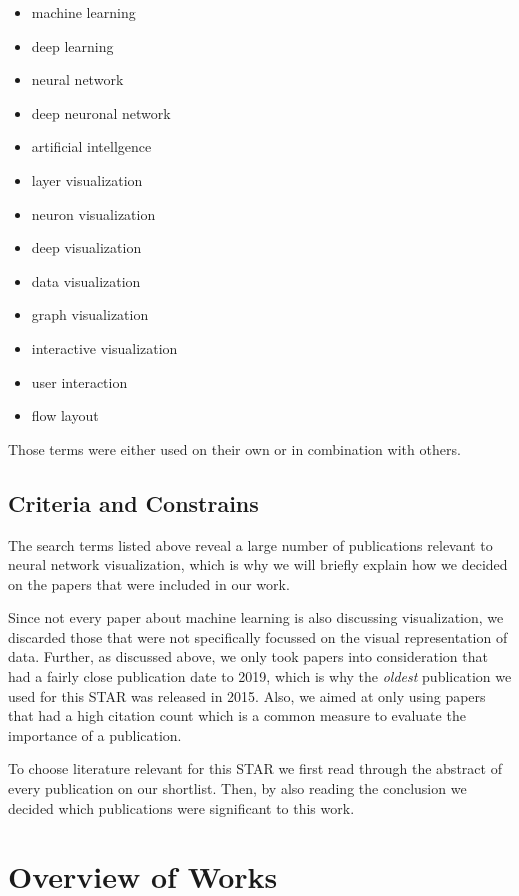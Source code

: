 \documentclass{acmsiggraph}               %
\begin{document}
\begin{multicols}{2}
\begin{itemize}
\item machine learning
\item deep learning
\item neural network
\item deep neuronal network
\item artificial intellgence
\item layer visualization
\item neuron visualization
\item deep visualization
\item data visualization
\item graph visualization
\item interactive visualization
\item user interaction
\item flow layout
\end{itemize}
\end{multicols}

Those terms were either used on their own or in combination with others.

\subsection{Criteria and Constrains}
The search terms listed above reveal a large number of publications relevant to neural network visualization, which is why we will briefly explain how we decided on the papers that were included in our work.

Since not every paper about machine learning is also discussing visualization, we discarded those that were not specifically focussed on the visual representation of data. Further, as discussed above, we only took papers into consideration that had a fairly close publication date to 2019, which is why the \textit{oldest} publication we used for this STAR was released in 2015. Also, we aimed at only using papers that had a high citation count which is a common measure to evaluate the importance of a publication.

To choose literature relevant for this STAR we first read through the abstract of every publication on our shortlist. Then, by also reading the conclusion we decided which publications were significant to this work.

\section{Overview of Works}
\end{document}
